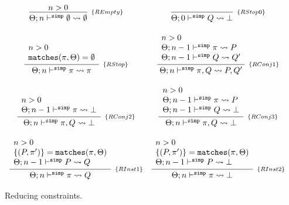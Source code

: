 \documentclass[a4paper, 11pt]{article}
\theoremstyle{definition}
\begin{document}
\begin{figure}[H]
  \[
    \begin{array}{cc}
      \infer[_{\{REmpty\}}]
            {\Theta ; n \simp \emptyset \leadsto \emptyset}
            {n > 0}
      &
      \infer[_{\{RStop0\}}]
            {\Theta ; 0 \simp Q \leadsto \bot}
            {}
      \\ \\
      \infer[_{\{RStop\}}]
            {\Theta ; n \simp \pi \leadsto \pi}
            {\begin{array}{l}
              n > 0 \\
              \mathtt{matches}(\pi,\Theta) = \emptyset
             \end{array}}
      &
      \infer[_{\{RConj1\}}]
            {\Theta ; n \simp \pi, Q \leadsto P, Q'}
            {\begin{array}{l}
              n > 0 \\
              \Theta ; n - 1 \simp \pi \leadsto P \\
              \Theta ; n - 1 \simp Q \leadsto Q'
             \end{array}}
      \\ \\
      \infer[_{\{RConj2\}}]
            {\Theta ; n \simp \pi, Q \leadsto \bot}
            {\begin{array}{l}
              n > 0 \\
              \Theta ; n - 1 \simp \pi \leadsto \bot \\
             \end{array}}
      &
      \infer[_{\{RConj3\}}]
            {\Theta ; n \simp \pi, Q \leadsto \bot}
            {\begin{array}{l}
              n > 0 \\
              \Theta ; n - 1 \simp \pi \leadsto P \\
              \Theta ; n - 1 \simp Q \leadsto \bot
             \end{array}}
      \\ \\
      \infer[_{\{RInst1\}}]
            {\Theta ; n \simp \pi \leadsto Q}
            {\begin{array}{l}
              n > 0 \\
              \{(P,\pi')\} = \mathtt{matches}(\pi,\Theta)\\
              \Theta;n - 1 \simp P \leadsto Q
             \end{array}}
      &
      \infer[_{\{RInst2\}}]
            {\Theta ; n \simp \pi \leadsto \bot}
            {\begin{array}{l}
              n > 0 \\
              \{(P,\pi')\} = \mathtt{matches}(\pi,\Theta)\\
              \Theta;n - 1 \simp P \leadsto \bot
             \end{array}}

    \end{array}
  \]
  \centering
  \caption{Reducing constraints.}
  \label{fig:reduce-constraints}
\end{figure}
\end{document}
